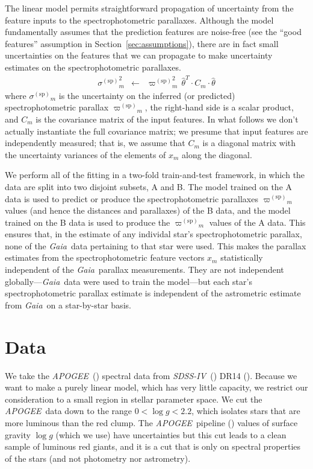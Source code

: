 \documentclass[modern]{aastex62}
\newcommand{\sectionname}{Section}
\newcommand{\acronym}[1]{{\small{#1}}}
\newcommand{\project}[1]{\textsl{#1}}
\newcommand{\apogee}{\project{\acronym{APOGEE}}}
\newcommand{\gaia}{\project{Gaia}}
\newcommand{\sdssiv}{\project{\acronym{SDSS-IV}}}
\newcommand{\logg}{\log g}
\newcommand{\sparallax}{{\varpi^{(\mathrm{sp})}}}
\newcommand{\ssigma}{{\sigma^{(\mathrm{sp})}}}
\begin{document}
The linear model permits straightforward propagation of uncertainty from the
feature inputs to the spectrophotometric parallaxes.
Although the model fundamentally assumes that the prediction features are noise-free
(see the ``good features'' assumption in \sectionname~\ref{sec:assumptions}),
there are in fact small uncertainties on the features that we can propagate to 
make uncertainty estimates on the spectrophotometric parallaxes.
\begin{eqnarray}
\ssigma_m^2 &\leftarrow& \sparallax_m^2\,\hat{\theta}^T\cdot C_m\cdot\hat{\theta}
\label{eq:unc}
\end{eqnarray}
where $\ssigma_m$ is the uncertainty on the inferred (or predicted)
spectrophotometric parallax $\sparallax_m$,
the right-hand side is a scalar product,
and $C_m$ is the covariance matrix of the input
features.
In what follows we don't actually instantiate the full covariance matrix; we presume
that input features are independently measured;
that is, we assume that $C_m$ is a diagonal matrix with the uncertainty variances of the elements
of $x_m$ along the diagonal.

We perform all of the fitting in a two-fold train-and-test framework,
in which the data are split into two disjoint subsets, A and B.
The model trained on the A data is used to predict or produce
the spectrophotometric parallaxes $\sparallax_m$ values (and hence
the distances and parallaxes) of the B data,
and the model trained on the B data is used to 
produce the $\sparallax_m$ values of the A data.
This ensures that, in the estimate of any individal star's
spectrophotometric parallax, none of the \gaia\ data pertaining to that star were used.
This makes the parallax estimates from the spectrophotometric feature vectors
$x_m$ statistically independent of the \gaia\ parallax measurements.
They are not independent globally---\gaia\ data were used to train the model---but
each star's spectrophotometric parallax estimate is independent
of the astrometric estimate from \gaia\ on a star-by-star basis.

\section{Data}

We take the \apogee\ (\citealt{aapogee, wapogee, apogee}) spectral data
from \sdssiv\ (\citealt{sdssiv}) \acronym{DR14} (\citealt{dr14}).
Because we want to make a purely linear model, which has very little capacity,
we restrict our consideration to a small region in stellar parameter space.
We cut the \apogee\ data down to the range $0<\logg<2.2$, which isolates
stars that are more luminous than the red clump.
The \apogee\ pipeline (\citealt{aspcap})
values of surface gravity $\logg$ (which we use) have uncertainties but
this cut leads to a clean sample of luminous red giants, and it is a cut
that is only on spectral properties of the stars (and not photometry nor astrometry).
\end{document}
